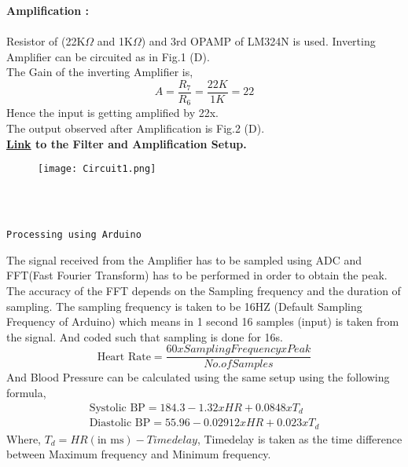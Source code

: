 \documentclass{homework}
\begin{document}
\textbf{Amplification :}\\
 \\
Resistor of (22K$\Omega$ and 1K$\Omega$) and 3rd OPAMP of LM324N is used. Inverting Amplifier can be circuited as in Fig.1 (D).\\
The Gain of the inverting Amplifier is,
\[A = \frac{R_7}{R_6} = \frac{22K}{1K} = 22\]
Hence the input is getting amplified by 22x.\\
The output observed after Amplification is Fig.2 (D).\\
\textbf{\href{https://drive.google.com/file/d/1NpnrK1EjaQGCwMMTEyrYlUoaqjVxqCX3/view?usp=sharing}{Link} to the Filter and Amplification Setup.}
\begin{figure}[h]
    \texttt{[image: Circuit1.png]}
    \caption{}
\end{figure}\\
\indent\ \ \ \ \ \indent\ \ \ \ \ \ \ \ \ \ \ \ \ \ \ \ \ \ \ \ \indent\  \ \ \ \ \ \ \ \ \ \ \ \ \ \ \ \indent\ \ \ \ \ \ \ \ \ \ \ \  \ \ \   \\
\begin{center}
    \large{\texttt{Processing using Arduino}}\\
\end{center}
The signal received from the Amplifier has to be sampled using ADC and FFT(Fast Fourier Transform) has to be performed in order to obtain the peak. The accuracy of the FFT depends on the Sampling frequency and the duration of sampling. The sampling frequency is taken to be 16HZ (Default Sampling Frequency of Arduino) which means in 1 second 16 samples (input) is taken from the signal. And coded such that sampling is done for 16s.
\[ \text{Heart Rate} = \frac{60xSampling FrequencyxPeak}{No. of Samples}\]
And Blood Pressure can be calculated using the same setup using the following formula,
\begin{align*}
    \text{Systolic BP} = 184.3 - 1.32xHR + 0.0848xT_d\\
\text{Diastolic BP} = 55.96 - 0.02912xHR + 0.023xT_d
\end{align*}
Where, $T_d = HR(\text{in ms}) - Timedelay$, Timedelay is taken as the time difference between Maximum frequency and Minimum frequency.\\
\end{document}
